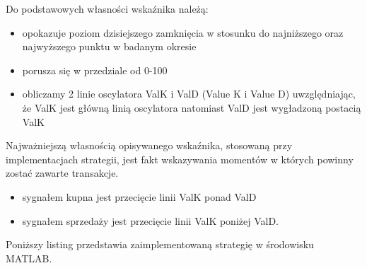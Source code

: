 \documentclass[12pt,a4paper]{article}
\begin{document}
\noindent Do podstawowych własności wskaźnika należą:
\begin{itemize}
\item opokazuje poziom dzisiejszego zamknięcia w stosunku do najniższego oraz najwyższego punktu w badanym okresie
\item porusza się w przedziale od 0-100
\item obliczamy 2 linie oscylatora ValK i ValD (Value K i Value D) uwzględniając, że ValK jest główną linią oscylatora natomiast ValD jest wygładzoną postacią ValK
\end{itemize}
Najważniejszą własnością opisywanego wskaźnika, stosowaną przy implementacjach strategii, jest fakt wskazywania momentów w których powinny zostać zawarte transakcje. 
\begin{itemize}
\item sygnałem kupna jest przecięcie linii ValK ponad ValD
\item sygnałem sprzedaży jest przecięcie linii ValK poniżej ValD.

\end{itemize}
\noindent Poniższy listing przedstawia zaimplementowaną strategię w środowisku MATLAB.
\end{document}
